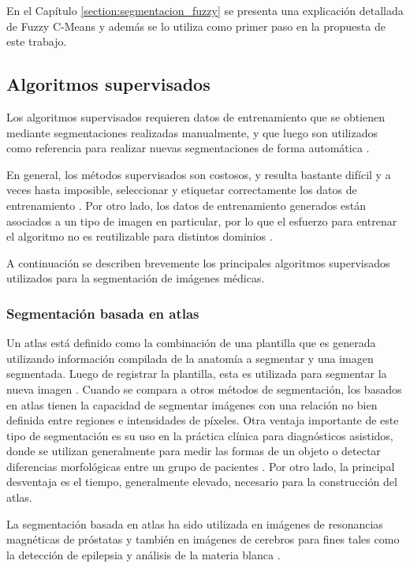 En el Capítulo \ref{section:segmentacion_fuzzy} se presenta una explicación detallada de Fuzzy C-Means y además se lo utiliza como primer paso en la propuesta de este trabajo.

\subsection{Algoritmos supervisados}
Los algoritmos supervisados requieren datos de entrenamiento que se obtienen mediante segmentaciones realizadas manualmente, y que luego son utilizados como referencia para realizar nuevas segmentaciones de forma automática \citep{pham2000current}.

En general, los métodos supervisados son costosos, y resulta bastante difícil y a veces hasta imposible, seleccionar y etiquetar correctamente los datos de entrenamiento \citep{jain2000statistical}. Por otro lado, los datos de entrenamiento generados están asociados a un tipo de imagen en particular, por lo que el esfuerzo para entrenar el algoritmo no es reutilizable para distintos dominios \citep{sharma2010automated}.

A continuación se describen brevemente los principales algoritmos supervisados utilizados para la segmentación de imágenes médicas.

\subsubsection{Segmentación basada en atlas}
Un atlas está definido como la combinación de una plantilla que es generada utilizando información compilada de la anatomía a segmentar y una imagen segmentada. Luego de registrar la plantilla, esta es utilizada para segmentar la nueva imagen \citep{cabezas2011review}. Cuando se compara a otros métodos de segmentación, los basados en atlas tienen la capacidad de segmentar imágenes con una relación no bien definida entre regiones e intensidades de píxeles. Otra ventaja importante de este tipo de segmentación es su uso en la práctica clínica para diagnósticos asistidos, donde se utilizan generalmente para medir las formas de un objeto o detectar diferencias morfológicas entre un grupo de pacientes \citep{kalinic2009atlas}. Por otro lado, la principal desventaja es el tiempo, generalmente elevado, necesario para la construcción del atlas.
 
La segmentación basada en atlas ha sido utilizada en imágenes de resonancias magnéticas de próstatas \citep{gubern2009atlas, klein2007segmentation, martin2010automated} y también en imágenes de cerebros para fines tales como la detección de epilepsia \citep{nagsemi} y análisis de la materia blanca \citep{lawes2008atlas}.

